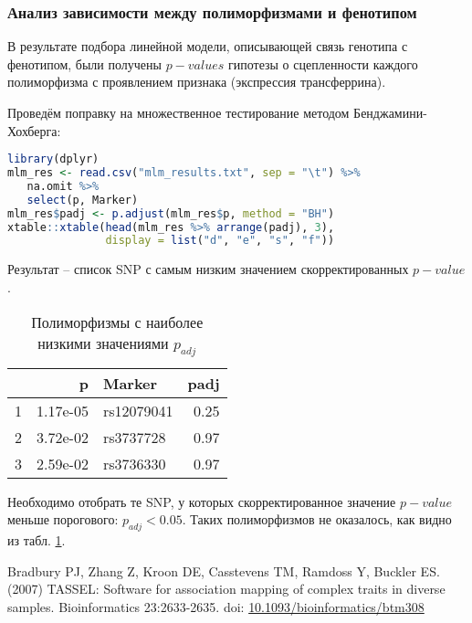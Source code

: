 \documentclass[a4paper,12pt]{article}
\begin{document}
\subsubsection{Анализ зависимости между полиморфизмами и фенотипом}

В результате подбора линейной модели, описывающей связь генотипа с фенотипом, были получены $p-values$ гипотезы о сцепленности каждого полиморфизма с проявлением признака (экспрессия трансферрина).

Проведём поправку на множественное тестирование методом Бенджамини-Хохберга:

\begin{lstlisting}[language=R]
library(dplyr)
mlm_res <- read.csv("mlm_results.txt", sep = "\t") %>%
   na.omit %>%
   select(p, Marker)
mlm_res$padj <- p.adjust(mlm_res$p, method = "BH")
xtable::xtable(head(mlm_res %>% arrange(padj), 3),
               display = list("d", "e", "s", "f"))
\end{lstlisting}

Результат -- список SNP с самым низким значением скорректированных $p-value$.
\begin{table}[H]
    \centering
    \caption{Полиморфизмы с наиболее низкими значениями $p_{adj}$}
    \begin{tabular}{rrlr}
        \hline
        & p & Marker & padj \\
        \hline
        1 & 1.17e-05 & rs12079041 & 0.25 \\
        2 & 3.72e-02 & rs3737728 & 0.97 \\
        3 & 2.59e-02 & rs3736330 & 0.97 \\
        \hline
    \end{tabular}
    \label{tab:snp}
\end{table}

Необходимо отобрать те SNP, у которых скорректированное значение $p-value$ меньше порогового: $ p_{adj} < 0.05 $.
Таких полиморфизмов не оказалось, как видно из табл. \ref{tab:snp}.

\begin{thebibliography}{99}
     Bradbury PJ, Zhang Z, Kroon DE, Casstevens TM, Ramdoss Y, Buckler ES. (2007) TASSEL: Software for association mapping of complex traits in diverse samples. Bioinformatics 23:2633-2635. doi: \href{https://doi.org/10.1093/bioinformatics/btm308}{10.1093/bioinformatics/btm308}
\end{thebibliography}
\end{document}
